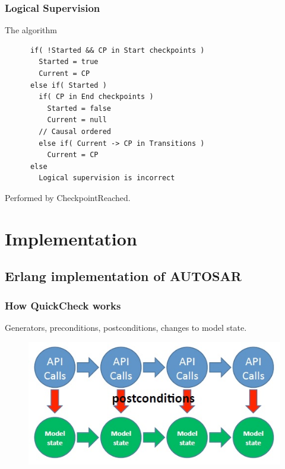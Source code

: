 \documentclass{beamer}
\begin{document}
\begin{frame}[fragile]
  \frametitle{Logical Supervision}
  \begin{block}{The algorithm}
    \begin{lstlisting}
      if( !Started && CP in Start checkpoints )
        Started = true
        Current = CP
      else if( Started )
        if( CP in End checkpoints )
          Started = false
          Current = null
        // Causal ordered
        else if( Current -> CP in Transitions )
          Current = CP
      else
        Logical supervision is incorrect
    \end{lstlisting}
  \end{block}
  Performed by CheckpointReached.
\end{frame}

\section{Implementation}


\subsection{Erlang implementation of AUTOSAR}

\begin{frame}
  \frametitle{How QuickCheck works}
  Generators, preconditions, postconditions, changes to model state.
  \begin{figure}
    \includegraphics[keepaspectratio, width=0.7\linewidth]{api_calls}
  \end{figure}
\end{frame}
\end{document}

